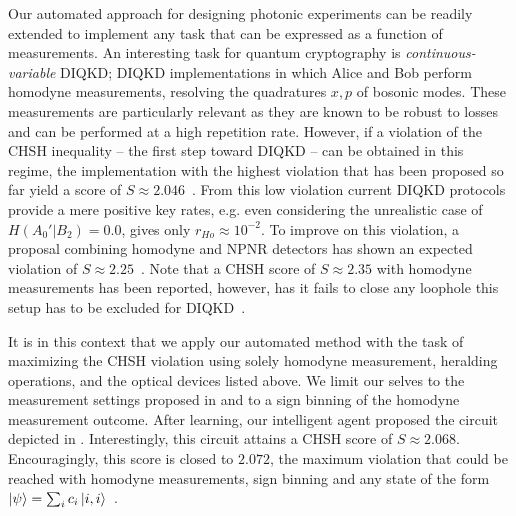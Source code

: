 Our automated approach for designing photonic experiments can be readily extended to implement any task that can be expressed as a function of measurements.
An interesting task for quantum cryptography is \textit{continuous-variable} DIQKD; DIQKD implementations in which Alice and Bob perform homodyne measurements, resolving the quadratures $x,p$ of bosonic modes.
These measurements are particularly relevant as they are known to be robust to losses and can be performed at a high repetition rate.
However, if a violation of the CHSH inequality -- the first step toward DIQKD -- can be obtained in this regime, the implementation with the highest violation that has been proposed so far yield a score of $S \approx 2.046$~\cite{GarciaPatron2004,GarciaPatron2005}.
From this low violation current DIQKD protocols provide a mere positive key rates, e.g. even considering the unrealistic case of $H(A_0'|B_2)=0.0$,  gives only $r_{Ho}\approx 10^{-2}$.
To improve on this violation, a proposal combining homodyne and NPNR detectors has shown an expected violation of $S\approx 2.25$~\cite{Cavalcanti2011}.
Note that a CHSH score of $S \approx 2.35$ with homodyne measurements has been reported, however, has it fails to close any loophole this setup has to be excluded for DIQKD~\cite{Thearle2018}.

It is in this context that we apply our automated method with the task of maximizing the CHSH violation using solely homodyne measurement, heralding operations, and the optical devices listed above.
We limit our selves to the measurement settings proposed in \cite{GarciaPatron2005} and to a sign binning of the homodyne measurement outcome.
After learning, our intelligent agent proposed the circuit depicted in . 
Interestingly, this circuit attains a CHSH score of $S\approx 2.068$. 
Encouragingly, this score is closed to $2.072$, the maximum violation that could be reached with homodyne measurements, sign binning and any state of the form $\ket{\psi}=\sum_i c_i \ket{i,i}$~\cite{Munro1999}.

